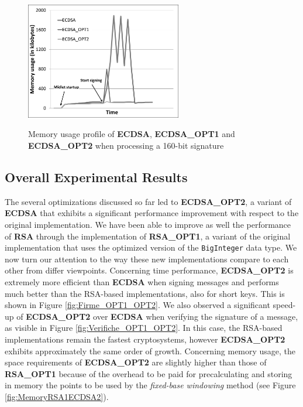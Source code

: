 \documentclass[authoryear]{elsarticle}
\begin{document}
\begin{figure}[ht]
\begin{center}
  \includegraphics[width=6.8cm]{immagini/MemoryECDSA_OPT2.pdf}\\
  \caption{Memory usage profile of \textbf{ECDSA}, \textbf{ECDSA\_OPT1} and \textbf{ECDSA\_OPT2} when processing a 160-bit signature}
  \label{fig:MemoryECDSA_OPT2}
\end{center}
\end{figure}





\subsection{Overall Experimental Results}

The several optimizations discussed so far led to \textbf{ECDSA\_OPT2}, a variant of \textbf{ECDSA} that exhibits a significant performance improvement with respect to the original implementation. We have been able to improve as well the performance of \textbf{RSA} through the implementation of \textbf{RSA\_OPT1}, a variant of the original implementation that uses the optimized version of the {\tt BigInteger} data type. We now turn our attention to the way these new implementations compare to each other from differ viewpoints. Concerning time performance, \textbf{ECDSA\_OPT2} is extremely more efficient than \textbf{ECDSA} when signing messages and performs much better than the RSA-based implementations, also for short keys. This is shown in Figure \ref{fig:Firme_OPT1_OPT2}. We also observed a significant speed-up of \textbf{ECDSA\_OPT2} over \textbf{ECDSA} when verifying the signature of a message, as visible in Figure  \ref{fig:Verifiche_OPT1_OPT2}. In this case, the RSA-based implementations remain the fastest cryptosystems, however \textbf{ECDSA\_OPT2} exhibits approximately the same order of growth. Concerning memory usage, the space requirements of \textbf{ECDSA\_OPT2} are slightly higher than those of \textbf{RSA\_OPT1} because of the overhead to be paid for precalculating and storing in memory  the points to be used by the \emph{fixed-base windowing} method (see Figure \ref{fig:MemoryRSA1ECDSA2}). 
\end{document}
